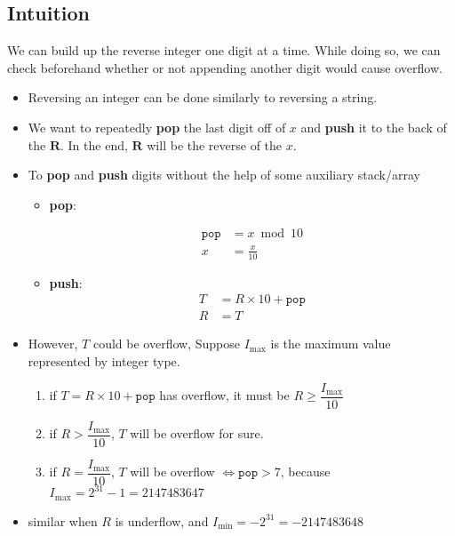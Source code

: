 \subsection{Intuition}
We can build up the reverse integer one digit at a time. While doing so, we can check beforehand whether or not appending another digit would cause overflow.
\begin{itemize}
\item Reversing an integer can be done similarly to reversing a string.
\item We want to repeatedly \textbf{pop} the last digit off of $x$ and \textbf{push} it to the back of the $\mathbf{R}$. In the end, $\mathbf{R}$ will be the reverse of the $x$.
\item To \textbf{pop} and \textbf{push} digits without the help of some auxiliary stack/array
\begin{itemize}
\item \textbf{pop}: 

\begin{align*}
\mathtt{pop} &= x \bmod 10 \\
x &= \frac{x}{10}
\end{align*}

\item \textbf{push}:
\begin{align*}
T &= R \times 10 + \mathtt{pop} \\
R &= T
\end{align*}
\end{itemize}
\item However, $T$ could be overflow, Suppose $I_{\max}$ is the maximum value represented by integer type.
\begin{enumerate}
\item if $T = R \times 10 + \mathtt{pop}$ has overflow, it must be $R \geq \dfrac{I_{\max}}{10}$
\item if $R > \dfrac{I_{\max}}{10} $, $T$ will be overflow for sure.
\item if $R = \dfrac{I_{\max}}{10}$, $T$ will be overflow $\iff \mathtt{pop} > 7$, because $I_{\max} = 2^{31} - 1 = 2147483647$
\end{enumerate}
\item similar when $R$ is underflow, and $I_{\min} = -2^{31} = -2147483648$
\end{itemize}


